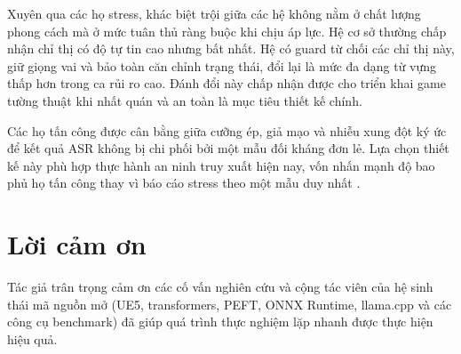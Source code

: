 ﻿\documentclass[a4paper,12pt]{article}
\begin{document}
Xuyên qua các họ stress, khác biệt trội giữa các hệ không nằm ở chất lượng phong cách mà ở mức tuân thủ ràng buộc khi chịu áp lực. Hệ cơ sở thường chấp nhận chỉ thị có độ tự tin cao nhưng bất nhất. Hệ có guard từ chối các chỉ thị này, giữ giọng vai và bảo toàn căn chỉnh trạng thái, đổi lại là mức đa dạng từ vựng thấp hơn trong ca rủi ro cao. Đánh đổi này chấp nhận được cho triển khai game tường thuật khi nhất quán và an toàn là mục tiêu thiết kế chính.

Các họ tấn công được cân bằng giữa cưỡng ép, giả mạo và nhiễu xung đột ký ức để kết quả ASR không bị chi phối bởi một mẫu đối kháng đơn lẻ. Lựa chọn thiết kế này phù hợp thực hành an ninh truy xuất hiện nay, vốn nhấn mạnh độ bao phủ họ tấn công thay vì báo cáo stress theo một mẫu duy nhất \cite{Zou2025PoisonedRAG,Chaturvedi2025AIP}.

\clearpage

\section*{Lời cảm ơn}
Tác giả trân trọng cảm ơn các cố vấn nghiên cứu và cộng tác viên của hệ sinh thái mã nguồn mở (UE5, transformers, PEFT, ONNX Runtime, llama.cpp và các công cụ benchmark) đã giúp quá trình thực nghiệm lặp nhanh được thực hiện hiệu quả.
\end{document}
